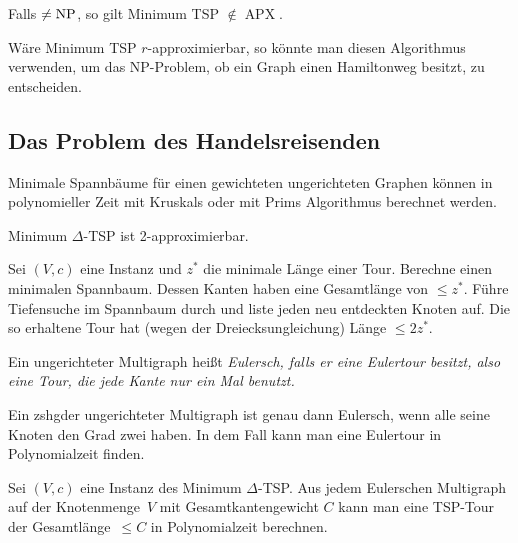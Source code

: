 \documentclass{cheat-sheet}
\DeclareMathOperator{\APX}{APX} %
\DeclareMathOperator{\NP}{NP} %
\let\P\relax %
\DeclareMathOperator{\P}{P} %
\begin{document}
\begin{satz}
  Falls $\P \neq \NP$, so gilt Minimum TSP $\not\in \APX$.
\end{satz}

\begin{samepage}

\begin{beweisidee}
  Wäre Minimum TSP $r$-approximierbar, so könnte man diesen Algorithmus verwenden, um das NP-Problem, ob ein Graph einen Hamiltonweg besitzt, zu entscheiden.
\end{beweisidee}

\subsection{Das Problem des Handelsreisenden}

\begin{erinnerung}
  Minimale Spannbäume für einen gewichteten ungerichteten Graphen können in polynomieller Zeit mit Kruskals oder mit Prims Algorithmus berechnet werden.
\end{erinnerung}

\end{samepage}

\begin{satz}
  Minimum $\Delta$-TSP ist 2-approximierbar.
\end{satz}

\begin{beweisskizze}
  Sei $(V, c)$ eine Instanz und $z^*$ die minimale Länge einer Tour.
  Berechne einen minimalen Spannbaum.
  Dessen Kanten haben eine Gesamtlänge von $\leq z^*$.
  Führe Tiefensuche im Spannbaum durch und liste jeden neu entdeckten Knoten auf.
  Die so erhaltene Tour hat (wegen der Dreiecksungleichung) Länge $\leq 2 z^*$.
\end{beweisskizze}

\begin{defn}
  Ein ungerichteter Multigraph heißt \em{Eulersch}, falls er eine \textit{Eulertour} besitzt, also eine Tour, die jede Kante nur ein Mal benutzt.
\end{defn}

\begin{lem}
  Ein zshgder ungerichteter Multigraph ist genau dann Eulersch, wenn alle seine Knoten den Grad zwei haben.
  In dem Fall kann man eine Eulertour in Polynomialzeit finden.
\end{lem}

\begin{lem}
  Sei $(V, c)$ eine Instanz des Minimum $\Delta$-TSP.
  Aus jedem Eulerschen Multigraph auf der Knotenmenge~$V$ mit Gesamtkantengewicht $C$ kann man eine TSP-Tour der Gesamtlänge~$\leq C$ in Polynomialzeit berechnen.
\end{lem}
\end{document}
